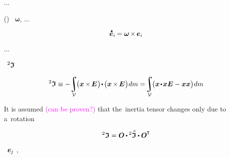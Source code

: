 ...

()
~$\bm{\omega}$, ...

\nopagebreak\begin{equation*}
\mathdotabove{\bm{e}}_i \hspace{-0.16ex}
= \bm{\omega} \hspace{-0.2ex} \times \hspace{-0.2ex} \bm{e}_i
\end{equation*}

...

~${\inertiatensor}$

\nopagebreak\begin{equation*}
\inertiatensor
\equiv
- \hspace{-0.4ex} \integral_{\mathcal{V}} \hspace{-0.4ex} \bigl( \bm{x} \hspace{-0.1ex} \times \hspace{-0.22ex} \UnitDyad \hspace{.1ex} \bigr) \hspace{-0.3ex} \dotp \hspace{-0.2ex} \bigl( \bm{x} \hspace{-0.1ex} \times \hspace{-0.22ex} \UnitDyad \hspace{.1ex} \bigr) \hspace{.1ex} dm
=
\hspace{-0.4ex} \integral_{\mathcal{V}} \hspace{-0.4ex} \bigl( \bm{x} \narrowdotp \bm{x} \UnitDyad - \bm{x} \bm{x} \bigr) \hspace{.1ex} dm
\end{equation*}

It is assumed \textcolor{magenta}{(can be proven?)} that the~inertia tensor changes only due to a~rotation

\vspace{-0.1em}\begin{equation*}
\inertiatensor = \rotationtensor \hspace{-0.1ex} \dotp \inertiatensorcircabove \dotp \rotationtensor^{\hspace{-0.1ex}\T}
\end{equation*}

\vspace{-0.1em}\noindent
{}
~${\bm{e}_{\hspace{-0.1ex}j}}$
,

